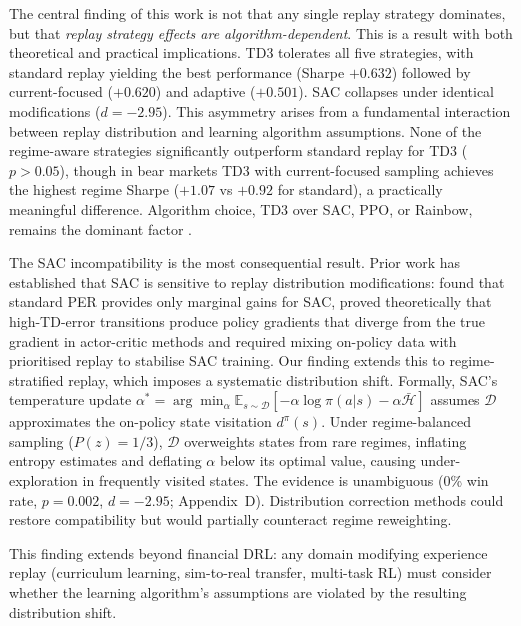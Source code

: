 \documentclass[11pt,a4paper]{article}
\begin{document}
The central finding of this work is not that any single replay strategy dominates, but that \textit{replay strategy effects are algorithm-dependent}. This is a result with both theoretical and practical implications. TD3 tolerates all five strategies, with standard replay yielding the best performance (Sharpe $+0.632$) followed by current-focused ($+0.620$) and adaptive ($+0.501$). SAC collapses under identical modifications ($d = -2.95$). This asymmetry arises from a fundamental interaction between replay distribution and learning algorithm assumptions. None of the regime-aware strategies significantly outperform standard replay for TD3 ($p > 0.05$), though in bear markets TD3 with current-focused sampling achieves the highest regime Sharpe ($+1.07$ vs $+0.92$ for standard), a practically meaningful difference. Algorithm choice, TD3 over SAC, PPO, or Rainbow, remains the dominant factor \citep{drl_survey2024, hoque2025review}.

The SAC incompatibility is the most consequential result. Prior work has established that SAC is sensitive to replay distribution modifications: \citet{wang2019ere} found that standard PER provides only marginal gains for SAC, \citet{saglam2023actor} proved theoretically that high-TD-error transitions produce policy gradients that diverge from the true gradient in actor-critic methods and \citet{banerjee2024improved} required mixing on-policy data with prioritised replay to stabilise SAC training. Our finding extends this to regime-stratified replay, which imposes a systematic distribution shift. Formally, SAC's temperature update $\alpha^* = \arg\min_\alpha \mathbb{E}_{s \sim \mathcal{D}}[-\alpha \log \pi(a|s) - \alpha \bar{\mathcal{H}}]$ assumes $\mathcal{D}$ approximates the on-policy state visitation $d^\pi(s)$. Under regime-balanced sampling ($P(z) = 1/3$), $\mathcal{D}$ overweights states from rare regimes, inflating entropy estimates and deflating $\alpha$ below its optimal value, causing under-exploration in frequently visited states. The evidence is unambiguous (0\% win rate, $p = 0.002$, $d = -2.95$; Appendix~D). Distribution correction methods \citep{kumar2020discor, sinha2022lfiw} could restore compatibility but would partially counteract regime reweighting.

This finding extends beyond financial DRL: any domain modifying experience replay (curriculum learning, sim-to-real transfer, multi-task RL) must consider whether the learning algorithm's assumptions are violated by the resulting distribution shift.
\end{document}
